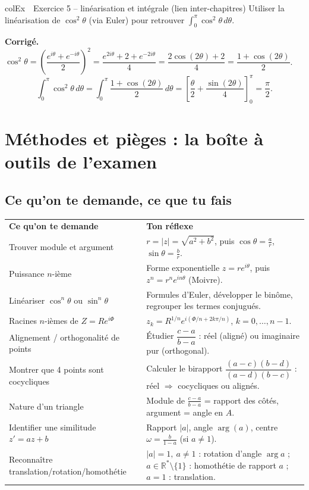 \documentclass[11pt,a4paper]{article}
\newenvironment{exemple}[1][Exemple]
  {\begin{fiche}{colEx}{\ding{217}~~#1}}{\end{fiche}}
\begin{document}
\begin{exemple}[Exercice 5 -- linéarisation et intégrale (lien inter-chapitres)]
Utiliser la linéarisation de $\cos^2\theta$ (via Euler) pour retrouver $\displaystyle\int_0^{\pi}\cos^2\theta\,d\theta$.

\smallskip
\textbf{Corrigé.} $\cos^2\theta=\left(\dfrac{e^{i\theta}+e^{-i\theta}}2\right)^2=\dfrac{e^{2i\theta}+2+e^{-2i\theta}}4=\dfrac{2\cos(2\theta)+2}4=\dfrac{1+\cos(2\theta)}2$.
\[
  \int_0^\pi\cos^2\theta\,d\theta = \int_0^\pi\frac{1+\cos(2\theta)}2\,d\theta = \left[\frac\theta2+\frac{\sin(2\theta)}4\right]_0^\pi = \frac\pi2.
\]
\end{exemple}

\section{Méthodes et pièges : la boîte à outils de l'examen}

\subsection{Ce qu'on te demande, ce que tu fais}

\begin{center}
\renewcommand{\arraystretch}{1.45}
\sffamily\small
\begin{tabular}{>{\raggedright\arraybackslash}p{7.2cm} >{\raggedright\arraybackslash}p{8cm}}
\rowcolor{qtealdark} \color{white}\bfseries Ce qu'on te demande & \color{white}\bfseries Ton réflexe \\
\rowcolor{tealpale} Trouver module et argument & $r=|z|=\sqrt{a^2+b^2}$, puis $\cos\theta=\frac ar$, $\sin\theta=\frac br$. \\
Puissance $n$-ième & Forme exponentielle $z=re^{i\theta}$, puis $z^n=r^ne^{in\theta}$ (Moivre). \\
\rowcolor{tealpale} Linéariser $\cos^n\theta$ ou $\sin^n\theta$ & Formules d'Euler, développer le binôme, regrouper les termes conjugués. \\
Racines $n$-ièmes de $Z=Re^{i\Phi}$ & $z_k=R^{1/n}e^{i(\Phi/n+2k\pi/n)}$, $k=0,\ldots,n-1$. \\
\rowcolor{tealpale} Alignement / orthogonalité de points & Étudier $\dfrac{c-a}{b-a}$ : réel (aligné) ou imaginaire pur (orthogonal). \\
Montrer que 4 points sont cocycliques & Calculer le birapport $\dfrac{(a-c)(b-d)}{(a-d)(b-c)}$ : réel $\Rightarrow$ cocycliques ou alignés. \\
Nature d'un triangle & Module de $\frac{c-a}{b-a}$ = rapport des côtés, argument = angle en $A$. \\
\rowcolor{tealpale} Identifier une similitude $z'=az+b$ & Rapport $|a|$, angle $\arg(a)$, centre $\omega=\frac{b}{1-a}$ (si $a\ne1$). \\
Reconnaître translation/rotation/homothétie & $|a|=1,\ a\ne1$ : rotation d'angle $\arg a$ ; $a\in\mathbb{R}^*\setminus\{1\}$ : homothétie de rapport $a$ ; $a=1$ : translation. \\
\end{tabular}
\end{center}
\end{document}
